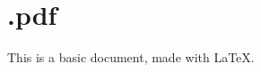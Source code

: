 \documentclass[12pt]{article}
\begin{document}
\section*{\jobname.pdf}

This is a basic document, made with \LaTeX .
\end{document}

